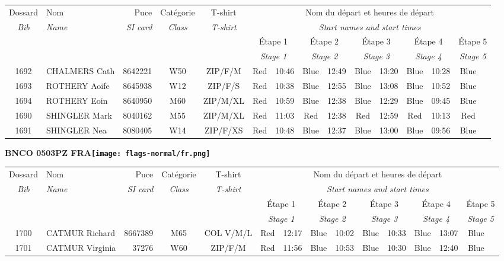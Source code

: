 \documentclass{report}
\begin{document}
  \begin{longtable}{|c|l|r|c|c|*{5}{cc|}}
    Dossard & Nom  & Puce    & Catégorie & T-shirt & \multicolumn{10}{c|}{Nom du départ et heures de départ} \\
    \itshape Bib     & \itshape Name & \itshape SI card & \itshape Class  & \itshape  T-shirt  & \multicolumn{10}{c|}{\itshape Start names and start times} \\
    \hline
    & & & & & \multicolumn{2}{c|}{Étape 1} & \multicolumn{2}{c|}{Étape 2} & \multicolumn{2}{c|}{Étape 3} & \multicolumn{2}{c|}{Étape 4} & \multicolumn{2}{c|}{Étape 5} \\
    & & & & & \multicolumn{2}{c|}{\itshape Stage 1} & \multicolumn{2}{c|}{\itshape Stage 2} & \multicolumn{2}{c|}{\itshape Stage 3} & \multicolumn{2}{c|}{\itshape Stage 4} & \multicolumn{2}{c|}{\itshape Stage 5} \\
    \hline
    1692 & CHALMERS Cath & 8642221 & W50 & ZIP/F/M & Red & 10:46 & Blue & 12:49 & Blue & 13:20 & Blue & 10:28 & Blue &  \\
    1693 & ROTHERY Aoife & 8645938 & W12 & ZIP/F/S & Red & 10:38 & Blue & 12:55 & Blue & 13:08 & Blue & 10:52 & Blue &  \\
    1694 & ROTHERY Eoin & 8640950 & M60 & ZIP/M/XL & Red & 10:59 & Blue & 12:38 & Blue & 12:29 & Blue & 09:45 & Blue &  \\
    1690 & SHINGLER Mark & 8040162 & M55 & ZIP/M/XL & Red & 11:03 & Red & 12:38 & Red & 12:59 & Red & 10:13 & Red &  \\
    1691 & SHINGLER Nea & 8080405 & W14 & ZIP/F/XS & Red & 10:48 & Blue & 12:37 & Blue & 13:00 & Blue & 09:56 & Blue &  \\
  \end{longtable}
\newpage
  \Huge \centering \bfseries BNCO 0503PZ FRA\normalfont \footnotesize \sffamily \hfill \texttt{[image: flags-normal/fr.png]} \newline 
  \begin{longtable}{|c|l|r|c|c|*{5}{cc|}}
    Dossard & Nom  & Puce    & Catégorie & T-shirt & \multicolumn{10}{c|}{Nom du départ et heures de départ} \\
    \itshape Bib     & \itshape Name & \itshape SI card & \itshape Class  & \itshape  T-shirt  & \multicolumn{10}{c|}{\itshape Start names and start times} \\
    \hline
    & & & & & \multicolumn{2}{c|}{Étape 1} & \multicolumn{2}{c|}{Étape 2} & \multicolumn{2}{c|}{Étape 3} & \multicolumn{2}{c|}{Étape 4} & \multicolumn{2}{c|}{Étape 5} \\
    & & & & & \multicolumn{2}{c|}{\itshape Stage 1} & \multicolumn{2}{c|}{\itshape Stage 2} & \multicolumn{2}{c|}{\itshape Stage 3} & \multicolumn{2}{c|}{\itshape Stage 4} & \multicolumn{2}{c|}{\itshape Stage 5} \\
    \hline
    1700 & CATMUR Richard & 8667389 & M65 & COL V/M/L & Red & 12:17 & Blue & 10:02 & Blue & 10:33 & Blue & 13:07 & Blue &  \\
    1701 & CATMUR Virginia & 37276 & W60 & ZIP/F/M & Red & 11:56 & Blue & 10:53 & Blue & 10:30 & Blue & 12:40 & Blue &  \\
  \end{longtable}
\end{document}
